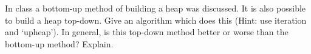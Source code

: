 In class a bottom-up method of building a heap was discussed.  It is also
possible to build a heap top-down.  Give an algorithm which does this (Hint:
use iteration and `upheap').  In general, is this top-down method better or 
worse than the bottom-up method?  Explain.
